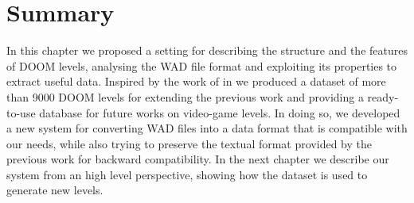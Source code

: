\newpage
\section{Summary}
In this chapter we proposed a setting for describing the structure and the features of DOOM levels, analysing the WAD file format and exploiting its properties to extract useful data. Inspired by the work of \citeauthor{VGLC} in  we produced a dataset of more than 9000 DOOM levels for extending the previous work and providing a ready-to-use database for future works on video-game levels. In doing so, we developed a new system for converting WAD files into a data format that is compatible with our needs, while also trying to preserve the textual format provided by the previous work for backward compatibility. In the next chapter we describe our system from an high level perspective, showing how the dataset is used to generate new levels.